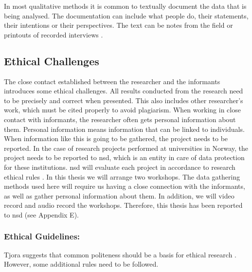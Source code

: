 In most qualitative methods it is common to textually document the data that is being analysed. The documentation can include what people do, their statements, their intentions or their perspectives. The text can be notes from the field or printouts of  recorded interviews \cite{qualitative}. 

\subsection{Ethical Challenges}
\label{sec:ethicalchallenges}
The close contact established between the researcher and the informants introduces some ethical challenges. All results conducted from the research need to be precisely and correct when presented. This also includes other researcher's work, which must be cited properly to avoid plagiarism. When working in close contact with informants, the researcher often gets personal information about them. Personal information means information that can be linked to individuals. When information like this is going to be gathered, the project needs to be reported. In the case of research projects performed at universities in Norway, the project needs to be reported to \ac{nsd}, which is an entity in care of data protection for these institutions. \ac{nsd} will evaluate each project in accordance to research ethical rules \cite{qualitative}. In this thesis we will arrange two workshops. The data gathering methods used here will require us having a close connection with the informants, as well as gather personal information about them. In addition, we will video record and audio record the workshops. Therefore, this thesis has been reported to \ac{nsd} (see Appendix E). 

\subsubsection{Ethical Guidelines:}
Tjora suggests that common politeness should be a basis for ethical research \cite{tjora}. However, some additional rules need to be followed. 

